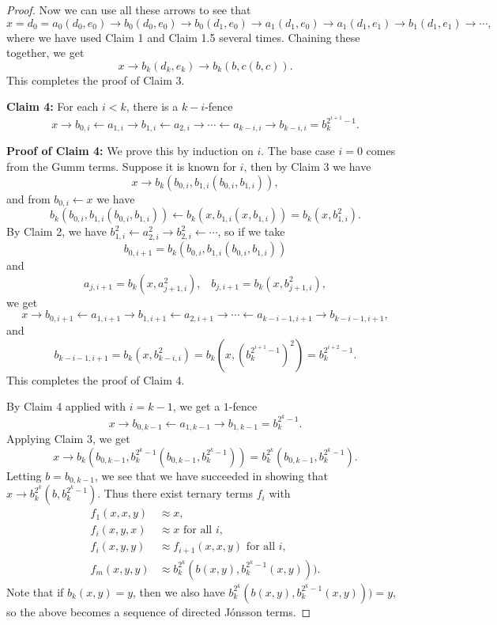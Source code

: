 \documentclass[letterpaper,11pt]{article}
\begin{document}
\begin{proof}
Now we can use all these arrows to see that
\[
x = d_0 = a_0(d_0,e_0) \rightarrow b_0(d_0,e_0) \rightarrow b_0(d_1,e_0) \rightarrow a_1(d_1,e_0) \rightarrow a_1(d_1,e_1) \rightarrow b_1(d_1,e_1) \rightarrow \cdots,
\]
where we have used Claim 1 and Claim 1.5 several times. Chaining these together, we get
\[
x \rightarrow b_k(d_k,e_k) \rightarrow b_k(b,c(b,c)).%
\]
This completes the proof of Claim 3.

{\bf Claim 4:} For each $i < k$, there is a $k-i$-fence
\[
x \rightarrow b_{0,i} \leftarrow a_{1,i} \rightarrow b_{1,i} \leftarrow a_{2,i} \rightarrow \cdots \leftarrow a_{k-i,i} \rightarrow b_{k-i,i} = b_k^{2^{i+1}-1}.
\]

{\bf Proof of Claim 4:} We prove this by induction on $i$. The base case $i=0$ comes from the Gumm terms. Suppose it is known for $i$, then by Claim 3 we have
\[
x \rightarrow b_k(b_{0,i},b_{1,i}(b_{0,i},b_{1,i})),
\]
and from $b_{0,i} \leftarrow x$ we have
\[
b_k(b_{0,i},b_{1,i}(b_{0,i},b_{1,i})) \leftarrow b_k(x,b_{1,i}(x,b_{1,i})) = b_k(x,b_{1,i}^2).
\]
By Claim 2, we have $b_{1,i}^2 \leftarrow a_{2,i}^2 \rightarrow b_{2,i}^2 \leftarrow \cdots$, so if we take
\[
b_{0,i+1} = b_k(b_{0,i},b_{1,i}(b_{0,i},b_{1,i}))
\]
and
\[
a_{j,i+1} = b_k(x,a_{j+1,i}^2), \;\;\; b_{j,i+1} = b_k(x,b_{j+1,i}^2),
\]
we get
\[
x \rightarrow b_{0,i+1} \leftarrow a_{1,i+1} \rightarrow b_{1,i+1} \leftarrow a_{2,i+1} \rightarrow \cdots \leftarrow a_{k-i-1,i+1} \rightarrow b_{k-i-1,i+1},
\]
and
\[
b_{k-i-1,i+1} = b_k(x,b_{k-i,i}^2) = b_k(x,(b_k^{2^{i+1}-1})^2) = b_k^{2^{i+2}-1}.
\]
This completes the proof of Claim 4.

By Claim 4 applied with $i = k-1$, we get a $1$-fence
\[
x \rightarrow b_{0,k-1} \leftarrow a_{1,k-1} \rightarrow b_{1,k-1} = b_k^{2^k-1}.
\]
Applying Claim 3, we get
\[
x \rightarrow b_k(b_{0,k-1},b_k^{2^k-1}(b_{0,k-1},b_k^{2^k-1})) = b_k^{2^k}(b_{0,k-1},b_k^{2^k-1}).
\]
Letting $b = b_{0,k-1}$, we see that we have succeeded in showing that $x \rightarrow b_k^{2^k}(b,b_k^{2^k-1})$. Thus there exist ternary terms $f_i$ with
\begin{align*}
f_1(x,x,y) &\approx x,\\
f_i(x,y,x) &\approx x\text{ for all }i,\\
f_i(x,y,y) &\approx f_{i+1}(x,x,y)\text{ for all }i,\\
f_m(x,y,y) &\approx b_k^{2^k}(b(x,y),b_k^{2^k-1}(x,y))).
\end{align*}
Note that if $b_k(x,y) = y$, then we also have $b_k^{2^k}(b(x,y),b_k^{2^k-1}(x,y))) = y$, so the above becomes a sequence of directed J\'onsson terms.


\end{proof}
\end{document}
